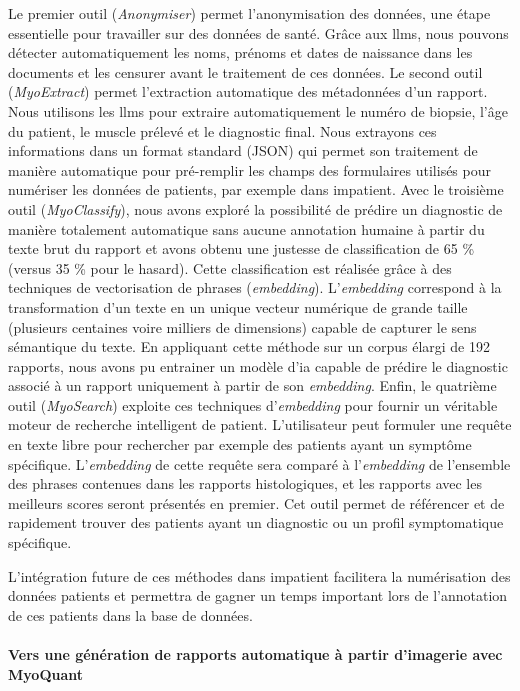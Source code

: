 Le premier outil (\textit{Anonymiser}) permet l’anonymisation des données, une étape essentielle pour travailler sur des données de santé. Grâce aux \gls{llms}, nous pouvons détecter automatiquement les noms, prénoms et dates de naissance dans les documents et les censurer avant le traitement de ces données. Le second outil (\textit{MyoExtract}) permet l’extraction automatique des métadonnées d’un rapport. Nous utilisons les \gls{llms} pour extraire automatiquement le numéro de biopsie, l’âge du patient, le muscle prélevé et le diagnostic final. Nous extrayons ces informations dans un format standard (JSON) qui permet son traitement de manière automatique pour pré-remplir les champs des formulaires utilisés pour numériser les données de patients, par exemple dans \gls{impatient}. Avec le troisième outil (\textit{MyoClassify}), nous avons exploré la possibilité de prédire un diagnostic de manière totalement automatique sans aucune annotation humaine à partir du texte brut du rapport et avons obtenu une justesse de classification de 65 \% (versus 35 \% pour le hasard). Cette classification est réalisée grâce à des techniques de vectorisation de phrases (\textit{embedding}). L’\textit{embedding} correspond à la transformation d’un texte en un unique vecteur numérique de grande taille (plusieurs centaines voire milliers de dimensions) capable de capturer le sens sémantique du texte. En appliquant cette méthode sur un corpus élargi de 192 rapports, nous avons pu entrainer un modèle d’\gls{ia} capable de prédire le diagnostic associé à un rapport uniquement à partir de son \textit{embedding}. Enfin, le quatrième outil (\textit{MyoSearch}) exploite ces techniques d’\textit{embedding} pour fournir un véritable moteur de recherche intelligent de patient. L’utilisateur peut formuler une requête en texte libre pour rechercher par exemple des patients ayant un symptôme spécifique. L’\textit{embedding} de cette requête sera comparé à l’\textit{embedding} de l’ensemble des phrases contenues dans les rapports histologiques, et les rapports avec les meilleurs scores seront présentés en premier. Cet outil permet de référencer et de rapidement trouver des patients ayant un diagnostic ou un profil symptomatique spécifique.

L’intégration future de ces méthodes dans \gls{impatient} facilitera la numérisation des données patients et permettra de gagner un temps important lors de l’annotation de ces patients dans la base de données.

\paragraph{\textbf{Vers une génération de rapports automatique à partir d’imagerie avec MyoQuant}}\mbox{}\\

